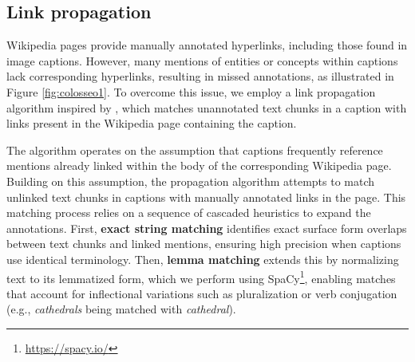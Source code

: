 \documentclass[11pt]{article}
\begin{document}


\subsection{Link propagation}
\label{subsec:link_prop}

Wikipedia pages provide manually annotated hyperlinks, including those found in image captions. However, many mentions of entities or concepts within captions lack corresponding hyperlinks, resulting in missed annotations, as illustrated in Figure \ref{fig:colosseo1}.
To overcome this issue, we employ a link propagation algorithm inspired by \citet{tedeschi2021wikineural}, which matches unannotated text chunks in a caption with links present in the Wikipedia page containing the caption.

The algorithm operates on the assumption that captions frequently reference mentions already linked within the body of the corresponding Wikipedia page. 
Building on this assumption, the propagation algorithm attempts to match unlinked text chunks in captions with manually annotated links in the page. 
This matching process relies on a sequence of cascaded heuristics to expand the annotations.
First, \textbf{exact string matching} identifies exact surface form overlaps between text chunks and linked mentions, ensuring high precision when captions use identical terminology.
Then, \textbf{lemma matching} extends this by normalizing text to its lemmatized form, which we perform using SpaCy\footnote{\url{https://spacy.io/}}, enabling matches that account for inflectional variations such as pluralization or verb conjugation (e.g., \textit{cathedrals} being matched with \textit{cathedral}).
\end{document}
